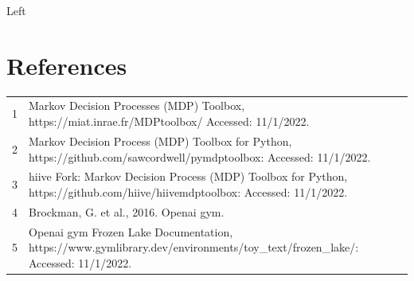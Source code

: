 \documentclass[letterpaper]{article} %
\begin{document}
Left 
\section{References}
\begin{tabular}{l p{2.75in}}
\\
1 & Markov Decision Processes (MDP) Toolbox, https://miat.inrae.fr/MDPtoolbox/ Accessed: 11/1/2022.
\\
2 & Markov Decision Process (MDP) Toolbox for Python, https://github.com/sawcordwell/pymdptoolbox: Accessed: 11/1/2022.
\\
3 & hiive Fork: Markov Decision Process (MDP) Toolbox for Python, https://github.com/hiive/hiivemdptoolbox: Accessed: 11/1/2022.
\\
4 & Brockman, G. et al., 2016. Openai gym.
\\
5 & Openai gym Frozen Lake Documentation,  https://www.gymlibrary.dev/environments/toy\_text/frozen\_lake/: Accessed: 11/1/2022.

\end{tabular}
\end{document}
